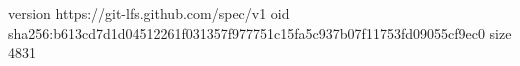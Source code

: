 version https://git-lfs.github.com/spec/v1
oid sha256:b613cd7d1d04512261f031357f977751c15fa5c937b07f11753fd09055cf9ec0
size 4831
